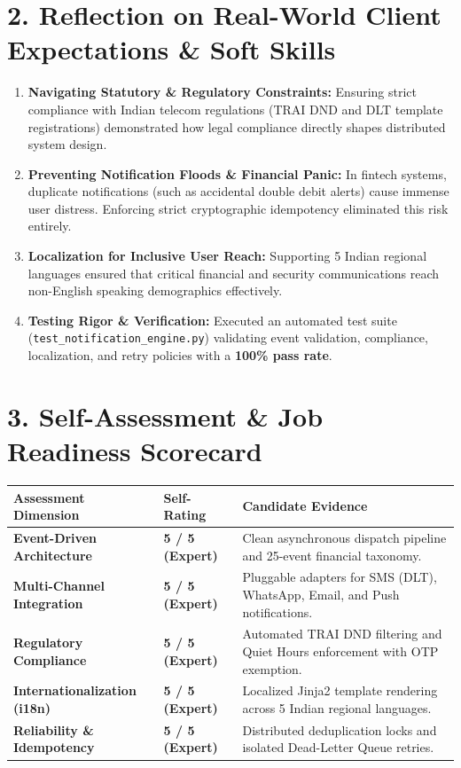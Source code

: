 \documentclass[11pt,a4paper]{article}
\begin{document}
\section{2. Reflection on Real-World Client Expectations \& Soft Skills}
\begin{enumerate}[leftmargin=1.5em, itemsep=3pt]
    \item \textbf{Navigating Statutory \& Regulatory Constraints:} Ensuring strict compliance with Indian telecom regulations (TRAI DND and DLT template registrations) demonstrated how legal compliance directly shapes distributed system design.
    \item \textbf{Preventing Notification Floods \& Financial Panic:} In fintech systems, duplicate notifications (such as accidental double debit alerts) cause immense user distress. Enforcing strict cryptographic idempotency eliminated this risk entirely.
    \item \textbf{Localization for Inclusive User Reach:} Supporting 5 Indian regional languages ensured that critical financial and security communications reach non-English speaking demographics effectively.
    \item \textbf{Testing Rigor \& Verification:} Executed an automated test suite (\texttt{test\_notification\_engine.py}) validating event validation, compliance, localization, and retry policies with a \textbf{100\% pass rate}.
\end{enumerate}

\section{3. Self-Assessment \& Job Readiness Scorecard}
\begin{table}[h]
\centering
\small
\begin{tabular}{@{}llp{8.5cm}@{}}
\toprule
\textbf{Assessment Dimension} & \textbf{Self-Rating} & \textbf{Candidate Evidence} \\ \midrule
\textbf{Event-Driven Architecture} & \textbf{5 / 5 (Expert)} & Clean asynchronous dispatch pipeline and 25-event financial taxonomy. \\
\textbf{Multi-Channel Integration} & \textbf{5 / 5 (Expert)} & Pluggable adapters for SMS (DLT), WhatsApp, Email, and Push notifications. \\
\textbf{Regulatory Compliance} & \textbf{5 / 5 (Expert)} & Automated TRAI DND filtering and Quiet Hours enforcement with OTP exemption. \\
\textbf{Internationalization (i18n)} & \textbf{5 / 5 (Expert)} & Localized Jinja2 template rendering across 5 Indian regional languages. \\
\textbf{Reliability \& Idempotency} & \textbf{5 / 5 (Expert)} & Distributed deduplication locks and isolated Dead-Letter Queue retries. \\ \bottomrule
\end{tabular}
\end{table}
\end{document}
